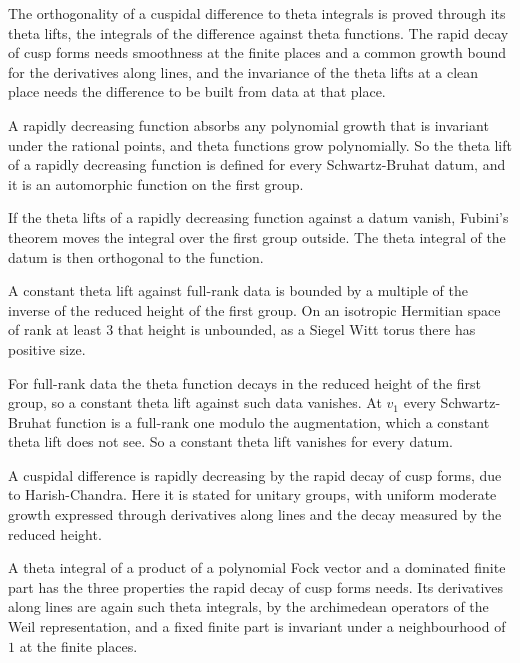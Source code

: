 The orthogonality of a cuspidal difference to theta integrals is proved through
its theta lifts, the integrals of the difference against theta functions. The
rapid decay of cusp forms needs smoothness at the finite places and a common
growth bound for the derivatives along lines, and the invariance of the theta
lifts at a clean place needs the difference to be built from data at that
place.

A rapidly decreasing function absorbs any polynomial growth that is invariant
under the rational points, and theta functions grow polynomially. So the theta
lift of a rapidly decreasing function is defined for every Schwartz-Bruhat
datum, and it is an automorphic function on the first group.

If the theta lifts of a rapidly decreasing function against a datum vanish,
Fubini's theorem moves the integral over the first group outside. The theta
integral of the datum is then orthogonal to the function.

A constant theta lift against full-rank data is bounded by a multiple of the
inverse of the reduced height of the first group. On an isotropic Hermitian
space of rank at least $3$ that height is unbounded, as a Siegel Witt torus
there has positive size.

For full-rank data the theta function decays in the reduced height of the first
group, so a constant theta lift against such data vanishes. At $v_1$ every
Schwartz-Bruhat function is a full-rank one modulo the augmentation, which a
constant theta lift does not see. So a constant theta lift vanishes for every
datum.

A cuspidal difference is rapidly decreasing by the rapid decay of cusp forms,
due to Harish-Chandra. Here it is stated for unitary groups, with uniform
moderate growth expressed through derivatives along lines and the decay
measured by the reduced height.

A theta integral of a product of a polynomial Fock vector and a dominated
finite part has the three properties the rapid decay of cusp forms needs. Its
derivatives along lines are again such theta integrals, by the archimedean
operators of the Weil representation, and a fixed finite part is invariant
under a neighbourhood of $1$ at the finite places.

